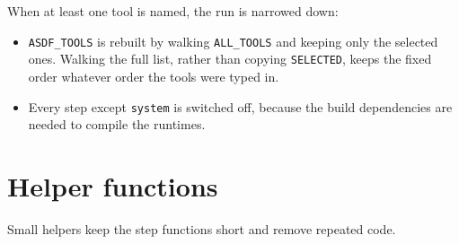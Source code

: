 \documentclass[11pt,a4paper]{article}
\newcommand{\cmd}[1]{\texttt{#1}}
\begin{document}
\noindent When at least one tool is named, the run is narrowed down:

\begin{itemize}
\item \cmd{ASDF\_TOOLS} is rebuilt by walking \cmd{ALL\_TOOLS} and keeping only the
  selected ones. Walking the full list, rather than copying \cmd{SELECTED}, keeps the
  fixed order whatever order the tools were typed in.
\item Every step except \cmd{system} is switched off, because the build dependencies
  are needed to compile the runtimes.
\end{itemize}

\section{Helper functions}

Small helpers keep the step functions short and remove repeated code.
\end{document}
